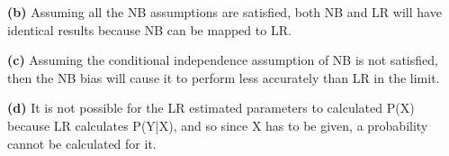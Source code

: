 \documentclass[11pt]{article}
\renewcommand{\part}[1] {\vspace{.10in} {\bf (#1)}}
\begin{document}
\part{b}
Assuming all the NB assumptions are satisfied, both NB and LR will have identical results because NB can be mapped to LR. 

\part{c}
Assuming the conditional independence assumption of NB is not satisfied, then the NB bias will cause it to perform less accurately than LR in the limit.

\part{d}
It is not possible for the LR estimated parameters to calculated P(X) because LR calculates P(Y|X), and so since X has to be given, a probability cannot be calculated for it.
\end{document}
